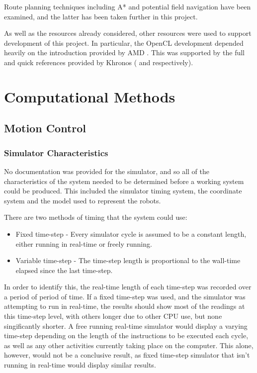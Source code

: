 \documentclass[10pt]{article}
\begin{document}
Route planning techniques including A* \cite{aiModernApproach} and potential
field navigation \cite{intelligentAlgorithmPathPlanning} have been examined, and
the latter has been taken further in this project.

As well as the resources already considered, other resources were used to
support development of this project.  In particular, the OpenCL development
depended heavily on the introduction provided by AMD \cite{amdOpenCLTutorial}.
This was supported by the full and quick references provided by Khronos
(\cite{openCl11Spec} and \cite{openCl11QuickRef} respectively).  

\section{Computational Methods}

\subsection{Motion Control\label{sub:motionControl}}

\subsubsection{Simulator Characteristics}

No documentation was provided for the simulator, and so all of the
characteristics of the system needed to be determined before a working system
could be produced.  This included the simulator timing system, the coordinate
system and the model used to represent the robots.

There are two methods of timing that the system could use:
\begin{itemize}
 \item Fixed time-step - Every simulator cycle is assumed to be a constant
 length, either running in real-time or freely running.
 \item Variable time-step - The time-step length is proportional to the
 wall-time elapsed since the last time-step.
\end{itemize}

In order to identify this, the real-time length of each time-step was recorded
over a period of period of time.  If a fixed time-step was used, and the
simulator was attempting to run in real-time, the results should show most of
the readings at this time-step level, with others longer due to other CPU
use, but none singificantly shorter.  A free running real-time simulator would
display a varying time-step depending on the length of the instructions to be
executed each cycle, as well as any other activities currently taking place on
the computer.  This alone, however, would not be a conclusive result, as fixed
time-step simulator that isn't running in real-time would display similar
results.
\end{document}
